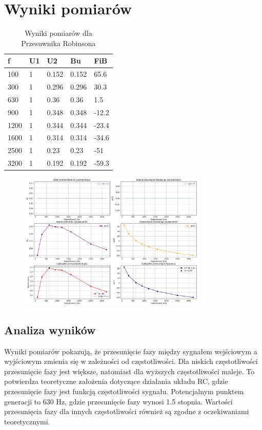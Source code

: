 \documentclass[11pt]{article}
\begin{document}
\section*{Wyniki pomiarów}
\begin{table}[!ht]
    \caption{Wyniki pomiarów dla Przesuwnika Robinsona}
    \centering
    \begin{tabular}{|l|l|l|l|l|}
    \hline
        f & U1 & U2 & Bu & FiB \\ \hline
        100 & 1 & 0.152 & 0.152 & 65.6 \\ \hline
        300 & 1 & 0.296 & 0.296 & 30.3 \\ \hline
        630 & 1 & 0.36 & 0.36 & 1.5 \\ \hline
        900 & 1 & 0.348 & 0.348 & -12.2 \\ \hline
        1200 & 1 & 0.344 & 0.344 & -23.4 \\ \hline
        1600 & 1 & 0.314 & 0.314 & -34.6 \\ \hline
        2500 & 1 & 0.23 & 0.23 & -51 \\ \hline
        3200 & 1 & 0.192 & 0.192 & -59.3 \\ \hline
    \end{tabular}
\end{table}
\begin{figure}
    \centering
    \includegraphics[width=0.8\textwidth]{Generator.png}
    \label{fig:robinson}
\end{figure}

\FloatBarrier %

\subsection*{Analiza wyników}
Wyniki pomiarów pokazują, że przesunięcie fazy między sygnałem wejściowym a wyjściowym zmienia się w zależności od częstotliwości. Dla niskich częstotliwości przesunięcie fazy jest większe,
natomiast dla wyższych częstotliwości maleje. To potwierdza teoretyczne założenia dotyczące działania układu RC, gdzie przesunięcie fazy jest funkcją częstotliwości sygnału.
Potencjalnym punktem generacji to 630 Hz, gdzie przesunięcie fazy wynosi 1.5 stopnia. Wartości przesunięcia fazy dla innych częstotliwości również są zgodne z oczekiwaniami teoretycznymi.
\end{document}
